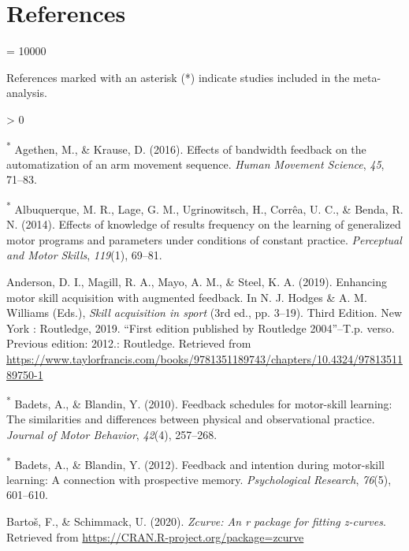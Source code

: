 \documentclass[
  english,
  man, donotrepeattitle,floatsintext]{apa7}
\newlength{\cslhangindent}
\newenvironment{CSLReferences}[2] %
 {%
  \setlength{\parindent}{0pt}
  \ifodd #1 \everypar{\setlength{\hangindent}{\cslhangindent}}\ignorespaces\fi
  \ifnum #2 > 0
  \setlength{\parskip}{#2\baselineskip}
  \fi
 }%
 {}
\begin{document}
\hypertarget{references}{%
\section{References}\label{references}}

\begingroup
\interlinepenalty = 10000
\setlength{\parindent}{-0.5in}
\setlength{\leftskip}{0.5in}

References marked with an asterisk (*) indicate studies included in the meta-analysis.

\endgroup

\hypertarget{refs}{}
\begin{CSLReferences}{1}{0}
\leavevmode\hypertarget{ref-Agethen2016}{}%
\textsuperscript{*} Agethen, M., \& Krause, D. (2016). Effects of bandwidth feedback on the automatization of an arm movement sequence. \emph{Human Movement Science}, \emph{45}, 71--83.

\leavevmode\hypertarget{ref-Albuquerque2014}{}%
\textsuperscript{*} Albuquerque, M. R., Lage, G. M., Ugrinowitsch, H., Corrêa, U. C., \& Benda, R. N. (2014). Effects of knowledge of results frequency on the learning of generalized motor programs and parameters under conditions of constant practice. \emph{Perceptual and Motor Skills}, \emph{119}(1), 69--81.

\leavevmode\hypertarget{ref-Anderson2019}{}%
Anderson, D. I., Magill, R. A., Mayo, A. M., \& Steel, K. A. (2019). Enhancing motor skill acquisition with augmented feedback. In N. J. Hodges \& A. M. Williams (Eds.), \emph{Skill acquisition in sport} (3rd ed., pp. 3--19). Third Edition. {{}} New York : Routledge, 2019. {{}} {``First edition published by Routledge 2004''}--T.p. verso. {{}} Previous edition: 2012.: Routledge. Retrieved from \url{https://www.taylorfrancis.com/books/9781351189743/chapters/10.4324/9781351189750-1}

\leavevmode\hypertarget{ref-Badets2010}{}%
\textsuperscript{*} Badets, A., \& Blandin, Y. (2010). Feedback schedules for motor-skill learning: The similarities and differences between physical and observational practice. \emph{Journal of Motor Behavior}, \emph{42}(4), 257--268.

\leavevmode\hypertarget{ref-Badets2012}{}%
\textsuperscript{*} Badets, A., \& Blandin, Y. (2012). Feedback and intention during motor-skill learning: A connection with prospective memory. \emph{Psychological Research}, \emph{76}(5), 601--610.

\leavevmode\hypertarget{ref-Bartoux1612020}{}%
Bartoš, F., \& Schimmack, U. (2020). \emph{Zcurve: An r package for fitting z-curves}. Retrieved from \url{https://CRAN.R-project.org/package=zcurve}


\end{CSLReferences}
\end{document}
